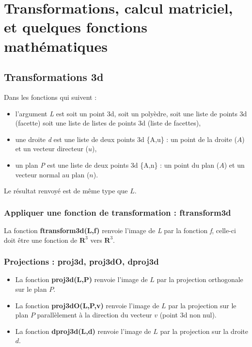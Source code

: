 \section{Transformations, calcul matriciel, et quelques fonctions mathématiques}

\subsection{Transformations 3d}

Dans les fonctions qui suivent :
\begin{itemize}
    \item l'argument \emph{L} est soit un point 3d, soit un polyèdre, soit une liste de points 3d (facette) soit une liste de listes de points 3d (liste de facettes),
    \item une droite \emph{d} est une liste de deux points 3d \{A,u\} : un point de la droite ($A$) et un vecteur directeur ($u$),
    \item un plan \emph{P} est une liste de deux points 3d \{A,n\} : un point du plan ($A$) et un vecteur normal au plan ($n$).
  \end{itemize}
Le résultat renvoyé est de même type que $L$.
  
\subsubsection{Appliquer une fonction de transformation : ftransform3d}

La fonction \textbf{ftransform3d(L,f)} renvoie l'image de \emph{L} par la fonction \emph{f}, celle-ci  doit être une fonction de $\mathbf R^3$ vers $\mathbf R^3$.

\subsubsection{Projections : proj3d, proj3dO, dproj3d}

\begin{itemize}
    \item La fonction \textbf{proj3d(L,P)} renvoie l'image de $L$ par la projection orthogonale sur le plan $P$.
    \item La fonction \textbf{proj3dO(L,P,v)} renvoie l'image de $L$ par la projection sur le plan $P$ parallèlement à la direction du vecteur $v$ (point 3d non nul).
    \item La fonction \textbf{dproj3d(L,d)} renvoie l'image de $L$ par la projection sur la droite $d$.
\end{itemize}

